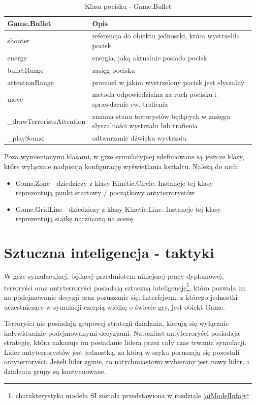 \begin{table}
\begin{center}
\begin{tabular}{|p{}|p{}|}
\hline
\textbf{Game.Bullet} & Opis\\\hline		
	shooter & referencja do obiektu jednostki,  która wystrzeliła pocisk\\
	energy & energia, jaką aktualnie posiada pocisk\\
	bulletRange & zasięg pocisku\\	
	attentionRange & promień w jakim wystrzelony pocisk jest słyszalny
\\\hline
	move & metoda odpowiedzialna za ruch pocisku i sprawdzenie ew. trafienia\\
	\_drawTerroristsAttention & zmiana stanu terrorystów będących w zasięgu słyszalności wystrzału lub trafienia\\
	\_playSound & odtwarzanie dźwięku wystrzału
\\\hline
\end{tabular}
\caption {Klasa pocisku - Game.Bullet\label{objectsGameBullet}}
\end{center}
\end{table} 
\clearpage
Poza wymienionymi klasami, w grze symulacyjnej zdefiniowane są jeszcze klasy, które wyłącznie nadpisują konfigurację wyświetlania kształtu. Należą do nich:
\begin{itemize}
	\item Game.Zone - dziedziczy z klasy Kinetic.Circle. Instancje tej klasy reprezentują punkt startowy / początkowy antyterrorystów
	\item Game.GridLine - dziedziczy z klasy Kinetic.Line. Instancje tej klasy reprezentują siatkę narzuconą na scenę
\end{itemize}

\section{Sztuczna inteligencja - taktyki}
W grze symulacujnej, będącej przedmiotem niniejszej pracy dyplomowej, terroryści oraz antyterroryści posiadają sztuczną inteligencję\footnote{charakterystyka modelu SI została przedstawiona w rozdziale \ref{aiModelInfo}}, która pozwala im na podejmowanie decyzji oraz poruszanie się. Interfejsem, z którego jednostki uczestniczące w symulacji czerpią wiedzę o świecie gry, jest obiekt Game. 

Terroryści nie posiadają grupowej strategii działania, kierują się wyłącznie indywidualnie podejmowanymi decyzjami. Natomiast antyterroryści posiadaja strategię, która nakazuje im posiadanie lidera przez cały czas trwania symulacji. Lider antyterrorystów jest jednostką, za którą w szyku poruszają się pozostali antyterroryści. Jeżeli lider zginie, to natychmiastowo wybierany jest nowy lider, a działania grupy są kontynuowane.
  
